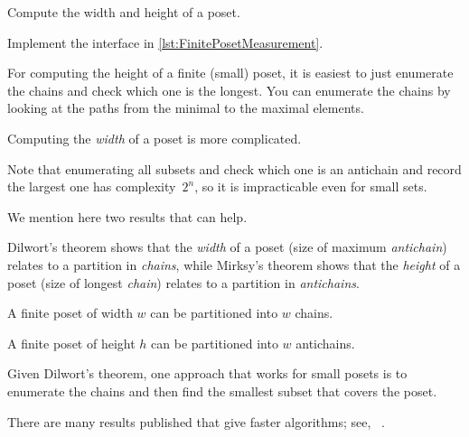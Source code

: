 
\begin{codeexercise}
    Compute the width and height of a poset.

    Implement the interface in \cref{lst:FinitePosetMeasurement}.
\end{codeexercise}



\begin{hint}
    For computing the height of a finite (small) poset, it is easiest to just enumerate the chains and check which one is the longest.
    You can enumerate the chains by looking at the paths from the minimal to the maximal elements.
\end{hint}

\begin{hint}
    Computing the \emph{width} of a poset is more complicated.

    Note that enumerating all subsets and check which one is an antichain and record the largest one has complexity~$2^n$, so it is impracticable even for small sets.

    We mention here two results that can help.

    Dilwort's theorem shows that the \emph{width} of a poset (size of maximum \emph{antichain}) relates to a partition in \emph{chains}, while Mirksy's theorem shows that the \emph{height} of a poset (size of longest \emph{chain}) relates to a partition in \emph{antichains}.

    \begin{theorem}
        \label{thm:dilwort}
        A finite poset of width $w$ can be partitioned into $w$ chains.
    \end{theorem}

    \begin{theorem}
        \label{thm:mirsky}
        A finite poset of height $h$ can be partitioned into $w$ antichains.
    \end{theorem}

    Given Dilwort's theorem, one approach that works for small posets is to enumerate the chains and then find the smallest subset that covers the poset.


    There are many results published that give faster algorithms; see, \eg~\cite{chen12decomposition}.

\end{hint}




